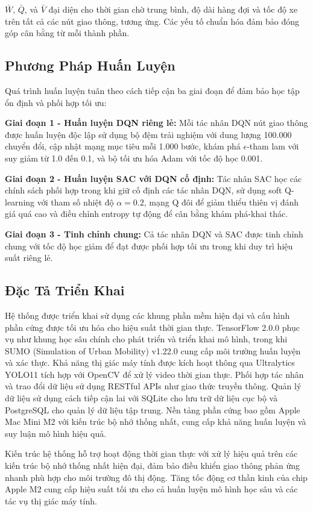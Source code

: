 $\bar{W}$, $\bar{Q}$, và $\bar{V}$ đại diện cho thời gian chờ trung bình, độ dài hàng đợi và tốc độ xe 
trên tất cả các nút giao thông, tương ứng. Các yếu tố chuẩn hóa đảm bảo đóng góp cân bằng từ mỗi thành phần.

\subsection{Phương Pháp Huấn Luyện}\label{subsec2a-5}

Quá trình huấn luyện tuân theo cách tiếp cận ba giai đoạn để đảm bảo học tập ổn định và phối hợp tối ưu:

\textbf{Giai đoạn 1 - Huấn luyện DQN riêng lẻ:} Mỗi tác nhân DQN nút giao thông được huấn luyện độc lập 
sử dụng bộ đệm trải nghiệm với dung lượng 100.000 chuyển đổi, cập nhật mạng mục tiêu mỗi 1.000 bước, 
khám phá $\epsilon$-tham lam với suy giảm từ 1.0 đến 0.1, và bộ tối ưu hóa Adam với tốc độ học 0.001.

\textbf{Giai đoạn 2 - Huấn luyện SAC với DQN cố định:} Tác nhân SAC học các chính sách phối hợp 
trong khi giữ cố định các tác nhân DQN, sử dụng soft Q-learning với tham số nhiệt độ $\alpha = 0.2$, 
mạng Q đôi để giảm thiểu thiên vị đánh giá quá cao và điều chỉnh entropy tự động để cân bằng khám phá-khai thác.

\textbf{Giai đoạn 3 - Tinh chỉnh chung:} Cả tác nhân DQN và SAC được tinh chỉnh chung với tốc độ học giảm 
để đạt được phối hợp tối ưu trong khi duy trì hiệu suất riêng lẻ.

\subsection{Đặc Tả Triển Khai}\label{subsec2a-6}

Hệ thống được triển khai sử dụng các khung phần mềm hiện đại và cấu hình phần cứng được tối ưu hóa 
cho hiệu suất thời gian thực. TensorFlow 2.0.0 phục vụ như khung học sâu chính cho phát triển và triển khai 
mô hình, trong khi SUMO (Simulation of Urban Mobility) v1.22.0 cung cấp môi trường huấn luyện và xác thực. 
Khả năng thị giác máy tính được kích hoạt thông qua Ultralytics YOLO11 tích hợp với OpenCV để xử lý video 
thời gian thực. Phối hợp tác nhân và trao đổi dữ liệu sử dụng RESTful APIs như giao thức truyền thông. 
Quản lý dữ liệu sử dụng cách tiếp cận lai với SQLite cho lưu trữ dữ liệu cục bộ và PostgreSQL cho quản lý 
dữ liệu tập trung. Nền tảng phần cứng bao gồm Apple Mac Mini M2 với kiến trúc bộ nhớ thống nhất, 
cung cấp khả năng huấn luyện và suy luận mô hình hiệu quả.

Kiến trúc hệ thống hỗ trợ hoạt động thời gian thực với xử lý hiệu quả trên các kiến trúc bộ nhớ thống nhất 
hiện đại, đảm bảo điều khiển giao thông phản ứng nhanh phù hợp cho môi trường đô thị động. 
Tăng tốc động cơ thần kinh của chip Apple M2 cung cấp hiệu suất tối ưu cho cả huấn luyện mô hình học sâu 
và các tác vụ thị giác máy tính.
